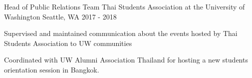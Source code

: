

\begin{cventries}

  \cventry
    {Head of Public Relations Team} %
    {Thai Students Association at the University of Washington} %
    {Seattle, WA} %
    {2017 - 2018} %
    {
      \begin{cvitems} %
        \item {Supervised and maintained communication about the events hosted by Thai Students Association to UW communities}
        \item {Coordinated with UW Alumni Association Thailand for hosting a new students orientation session in Bangkok.}
      \end{cvitems}
    }

\end{cventries}
